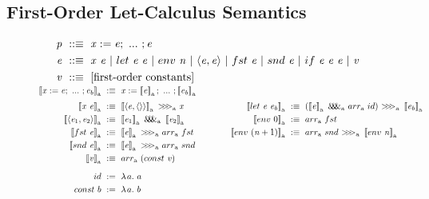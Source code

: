 \subsection{First-Order Let-Calculus Semantics}

\begin{figure}[!tb]\centering
\smallmathfont
\begin{align*}
	\mathit{p} &\ ::\equiv \ \mathit{x := e};\ ...\ ; \mathit{e}
\\
	\mathit{e} &\ ::\equiv \ \mathit{x~e}\ |\ let~\mathit{e~e}\ |\ env~\mathit{n}\ |\ \mathit{\pair{e,e}}\ |\ fst~\mathit{e}\ |\ snd~\mathit{e}\ |\ if~\mathit{e~e~e}\ |\ \mathit{v}
\\
	\mathit{v} &\ ::\equiv \ \text{[first-order constants]}
\\[-6pt]
\end{align*}
\begin{align*}
\begin{aligned}[t]
	\meaningof{\mathit{x} := \mathit{e};\ ...\ ; \mathit{e_b}}\gen &\ :\equiv\
		\mathit{x} := \meaningof{\mathit{e}}\gen;\ ...\ ; \meaningof{\mathit{e_b}}\gen
\\[3pt]
	\meaningof{\mathit{x}~\mathit{e}}\gen &\ :\equiv\
		\meaningof{\pair{\mathit{e},\pair{}}}\gen~\arrowcomp\gen~\mathit{x}
\\
	\meaningof{\pair{\mathit{e}_1,\mathit{e}_2}}\gen &\ :\equiv\
		\meaningof{\mathit{e}_1}\gen~\arrowpair\gen~\meaningof{\mathit{e}_2}\gen
\\
	\meaningof{fst~\mathit{e}}\gen &\ :\equiv\
		\meaningof{\mathit{e}}\gen~\arrowcomp\gen~\arrowarr\gen~fst
\\
	\meaningof{snd~\mathit{e}}\gen &\ :\equiv\
		\meaningof{\mathit{e}}\gen~\arrowcomp\gen~\arrowarr\gen~snd
\\
	\meaningof{\mathit{v}}\gen &\ :\equiv\ \arrowarr\gen~(const~\mathit{v})
\\[6pt]
	id &\ := \ \fun{a} a
\\
	const~b &\ := \ \fun{a} b
\\
\end{aligned}
&\tab\tab\tab\tab
\begin{aligned}[t]
\\[3pt]
	\meaningof{let~\mathit{e}~\mathit{e_b}}\gen &\ :\equiv\ 
		(\meaningof{\mathit{e}}\gen~\arrowpair\gen~\arrowarr\gen~id)~
			\arrowcomp\gen~
		\meaningof{\mathit{e_b}}\gen
\\
	\meaningof{env~0}\gen &\ :\equiv\ \arrowarr\gen~fst
\\
	\meaningof{env~(\mathit{n}+1)}\gen &\ :\equiv\ \arrowarr\gen~snd~\arrowcomp\gen~\meaningof{env~\mathit{n}}\gen

\end{aligned}
\end{align*}
\end{figure}
